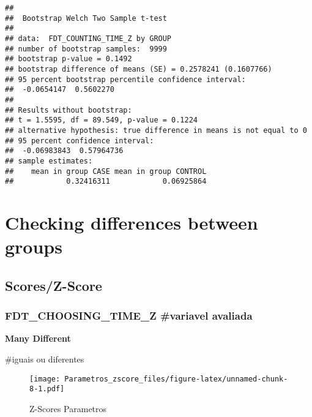 \documentclass[
]{article}
\newenvironment{Shaded}{\begin{snugshade}}{\end{snugshade}}
\newcommand{\AttributeTok}[1]{\textcolor[rgb]{0.13,0.29,0.53}{#1}}
\newcommand{\DecValTok}[1]{\textcolor[rgb]{0.00,0.00,0.81}{#1}}
\newcommand{\FunctionTok}[1]{\textcolor[rgb]{0.13,0.29,0.53}{\textbf{#1}}}
\newcommand{\NormalTok}[1]{#1}
\newcommand{\SpecialCharTok}[1]{\textcolor[rgb]{0.81,0.36,0.00}{\textbf{#1}}}
\newcommand{\StringTok}[1]{\textcolor[rgb]{0.31,0.60,0.02}{#1}}
\begin{document}
\begin{verbatim}
## 
##  Bootstrap Welch Two Sample t-test
## 
## data:  FDT_COUNTING_TIME_Z by GROUP
## number of bootstrap samples:  9999
## bootstrap p-value = 0.1492 
## bootstrap difference of means (SE) = 0.2578241 (0.1607766) 
## 95 percent bootstrap percentile confidence interval:
##  -0.0654147  0.5602270
## 
## Results without bootstrap:
## t = 1.5595, df = 89.549, p-value = 0.1224
## alternative hypothesis: true difference in means is not equal to 0
## 95 percent confidence interval:
##  -0.06983843  0.57964736
## sample estimates:
##    mean in group CASE mean in group CONTROL 
##            0.32416311            0.06925864
\end{verbatim}

\section{\texorpdfstring{\textbf{Checking differences between
groups}}{Checking differences between groups}}\label{checking-differences-between-groups-6}

\subsection{\texorpdfstring{\textbf{Scores/Z-Score}}{Scores/Z-Score}}\label{scoresz-score-6}

\subsubsection{FDT\_CHOOSING\_TIME\_Z \#variavel
avaliada}\label{fdt_choosing_time_z-variavel-avaliada}

\textbf{Many Different}

\#iguais ou diferentes

\begin{Shaded}
\end{Shaded}

\begin{figure}
\centering
\texttt{[image: Parametros\_zscore\_files/figure-latex/unnamed-chunk-8-1.pdf]}
\caption{Z-Scores Parametros}
\end{figure}
\end{document}
